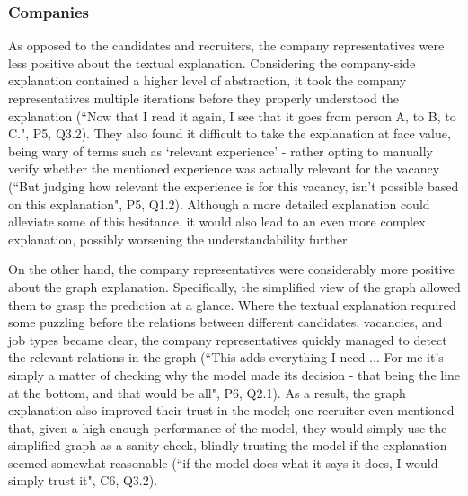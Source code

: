 \subsubsection{Companies}
As opposed to the candidates and recruiters, the company representatives were less positive about the textual explanation. Considering the company-side explanation contained a higher level of abstraction, it took the company representatives multiple iterations before they properly understood the explanation (``Now that I read it again, I see that it goes from person A, to B, to C.", P5, Q3.2). They also found it difficult to take the explanation at face value, being wary of terms such as `relevant experience' - rather opting to manually verify whether the mentioned experience was actually relevant for the vacancy (``But judging how relevant the experience is for this vacancy, isn't possible based on this explanation", P5, Q1.2). Although a more detailed explanation could alleviate some of this hesitance, it would also lead to an even more complex explanation, possibly worsening the understandability further. 

On the other hand, the company representatives were considerably more positive about the graph explanation. Specifically, the simplified view of the graph allowed them to grasp the prediction at a glance. Where the textual explanation required some puzzling before the relations between different candidates, vacancies, and job types became clear, the company representatives quickly managed to detect the relevant relations in the graph (``This adds everything I need ... For me it's simply a matter of checking why the model made its decision - that being the line at the bottom, and that would be all", P6, Q2.1). As a result, the graph explanation also improved their trust in the model; one recruiter even mentioned that, given a high-enough performance of the model, they would simply use the simplified graph as a sanity check, blindly trusting the model if the explanation seemed somewhat reasonable (``if the model does what it says it does, I would simply trust it", C6, Q3.2). 

